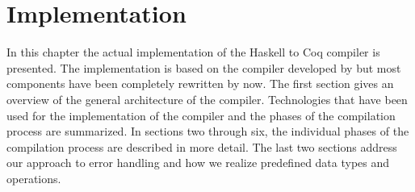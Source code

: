 \chapter{Implementation} \label{chp:implementation}
In this chapter the actual implementation of the Haskell to Coq compiler is presented.
The implementation is based on the compiler developed by \cite{Jessen:2019} but most components have been completely rewritten by now.
The first section gives an overview of the general architecture of the compiler.
Technologies that have been used for the implementation of the compiler and the phases of the compilation process are summarized.
In sections two through six, the individual phases of the compilation process are described in more detail.
The last two sections address our approach to error handling and how we realize predefined data types and operations.









